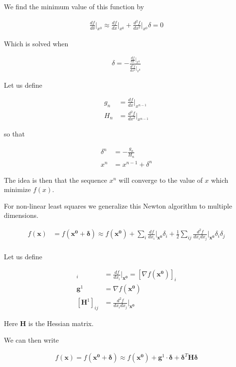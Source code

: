 \documentclass[12pt]{article}
\newcommand{\bv}[1]{\boldsymbol{#1}}
\begin{document}
We find the minimum value of this function by

\begin{align}
\frac{df}{d\delta}\Big\rvert_{x^0} \approx \frac{df}{dx}\Big\rvert_{x^0} + \frac{d^2f}{dx^2}\Big\rvert_{x^0} \delta= 0
\end{align}

Which is solved when

\begin{align}
\delta = -\frac{\frac{df}{dx}\Big\rvert_{x^0}}{\frac{d^2f}{dx^2}\Big\rvert_{x^0}}
\end{align}

Let us define

\begin{align}
g_n &= \frac{df}{dx}\Big\rvert_{x^{n-1}}\\
H_n &= \frac{d^2f}{dx^2}\Big\rvert_{x^{n-1}}
\end{align}

so that 

\begin{align}
\delta^n &= -\frac{g_n}{H_n}\\
x^n &= x^{n-1} + \delta^n
\end{align}

The idea is then that the sequence $x^n$ will converge to the value of $x$ which minimize $f(x)$.

For non-linear least squares we generalize this Newton algorithm to multiple dimensions.

\begin{align}
f(\bv{x}) &= f(\bv{x^0} + \bv{\delta}) \approx f(\bv{x^0}) + \sum_i \frac{df}{dx_i}\Big\rvert_{\bv{x^0}}\delta_i + \frac{1}{2}\sum_{ij} \frac{d^2f}{dx_idx_j}\Big\rvert_{\bv{x^0}} \delta_i \delta_j\\
\end{align}

Let us define

\begin{align}
[\bv{g}^1]_i &= \frac{df}{dx_i}\Big\rvert_{\bv{x^0}} = [\nabla f(\bv{x^0})]_i\\
\bv{g}^1 &= \nabla f(\bv{x^0})\\
[\bv{H}^1]_{ij} &= \frac{d^2f}{dx_idx_j}\Big\rvert_{\bv{x^0}}
\end{align}

Here $\bv{H}$ is the Hessian matrix.

We can then write

\begin{align}
f(\bv{x}) = f(\bv{x^0} + \bv{\delta}) \approx f(\bv{x^0}) + \bv{g}^1\cdot \bv{\delta} + \bv{\delta}^T\bv{H}\bv{\delta}
\end{align}
\end{document}
